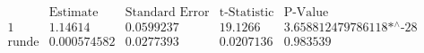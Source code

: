 \[\begin{array}{l|llll}
 \text{} & \text{Estimate} & \text{Standard Error} & \text{t-Statistic} & \text{P-Value} \\
\hline
 1 & 1.14614 & 0.0599237 & 19.1266 & \text{3.658812479786118$\grave{ }$*${}^{\wedge}$-28} \\
 \text{runde} & 0.000574582 & 0.0277393 & 0.0207136 & 0.983539 \\
\end{array}\]

